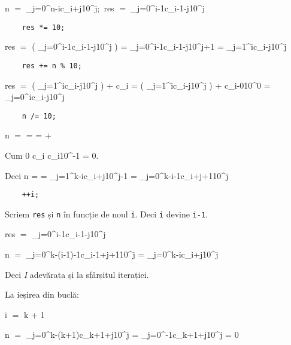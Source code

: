 \documentclass[11pt]{article}
\begin{document}
n $=$ \sum\limits_{j=0}^{n-i}c_{i+j}10^{j};\ 
res $=$ \sum\limits_{j=0}^{i-1}c_{i-1-j}10^{j}

\begin{verbatim}
    res *= 10;
\end{verbatim}

res $=$ \left( \sum\limits_{j=0}^{i-1}c_{i-1-j}10^{j} \right)  
= \sum\limits_{j=0}^{i-1}c_{i-1-j}10^{j+1} 
= \sum\limits_{j=1}^{i}c_{i-j}10^{j}

\begin{verbatim}
    res += n % 10;
\end{verbatim}

res $=$ \left( \sum\limits_{j=1}^{i}c_{i-j}10^{j} \right) + c_{i} 
= \left( \sum\limits_{j=1}^{i}c_{i-j}10^{j} \right) + c_{i-0}10^{0} 
= \sum\limits_{j=0}^{i}c_{i-j}10^{j} 

\begin{verbatim}
    n /= 10;
\end{verbatim}

n $=$ \left[ \left( \sum\limits_{j=0}^{k-i}c_{i+j}10^{j} \right) / \ 10 \right]
= \left[ \sum\limits_{j=0}^{k-i}c_{i+j}10^{j-1} \right]
= \left[ \sum\limits_{j=1}^{k-i}c_{i+j}10^{j-1} \right] + \left[c_{i}10^{-1} \right]

Cum 0 \le c_{i}   \le c_{i}10^{-1}  \implies  \left[c_{i}10^{-1} \right] = 0.

Deci n = \left[ \sum\limits_{j=1}^{k-i}c_{i+j}10^{j-1} \right] = \sum\limits_{j=1}^{k-i}c_{i+j}10^{j-1} = \sum\limits_{j=0}^{k-i-1}c_{i+j+1}10^{j} 

\begin{verbatim}
    ++i;
\end{verbatim}

Scriem \texttt{res} și \texttt{n} în funcție de noul \texttt{i}. Deci \texttt{i} devine \texttt{i-1}.

res $=$ \sum\limits_{j=0}^{i-1}c_{i-1-j}10^{j}

n $=$ \sum\limits_{j=0}^{k-(i-1)-1}c_{i-1+j+1}10^{j} = \sum\limits_{j=0}^{k-i}c_{i+j}10^{j} 

Deci \textit{I} adevărata și la sfârșitul iterației.


\vspace{14pt}
La ieșirea din buclă:

i $=$ k + 1

n $=$ \sum\limits_{j=0}^{k-(k+1)}c_{k+1+j}10^{j}
= \sum\limits_{j=0}^{-1}c_{k+1+j}10^{j} = 0
\end{document}
